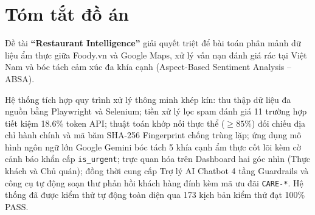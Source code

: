 \chapter*{Tóm tắt đồ án}

Đề tài \textbf{``Restaurant Intelligence''} giải quyết triệt để bài toán phân mảnh dữ liệu ẩm thực giữa Foody.vn và Google Maps, xử lý vấn nạn đánh giá rác tại Việt Nam và bóc tách cảm xúc đa khía cạnh (Aspect-Based Sentiment Analysis -- ABSA).

Hệ thống tích hợp quy trình xử lý thông minh khép kín: thu thập dữ liệu đa nguồn bằng Playwright và Selenium; tiền xử lý lọc spam đánh giá 11 trường hợp tiết kiệm 18.6\% token API; thuật toán khớp nối thực thể ($\ge 85\%$) đối chiếu địa chỉ hành chính và mã băm SHA-256 Fingerprint chống trùng lặp; ứng dụng mô hình ngôn ngữ lớn Google Gemini bóc tách 5 khía cạnh ẩm thực cốt lõi kèm cờ cảnh báo khẩn cấp \texttt{is\_urgent}; trực quan hóa trên Dashboard hai góc nhìn (Thực khách và Chủ quán); đồng thời cung cấp Trợ lý AI Chatbot 4 tầng Guardrails và công cụ tự động soạn thư phản hồi khách hàng đính kèm mã ưu đãi \texttt{CARE-*}. Hệ thống đã được kiểm thử tự động toàn diện qua 173 kịch bản kiểm thử đạt 100\% PASS.
